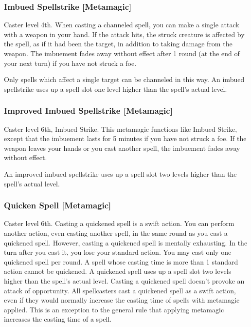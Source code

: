 \subsubsection{Imbued Spellstrike [Metamagic]}
 Caster level 4th.
 When casting a channeled spell, you can make a single attack with a weapon in your hand. If the attack hits, the struck creature is affected by the spell, as if it had been the target, in addition to taking damage from the weapon. The imbuement fades away without effect after 1 round (at the end of your next turn) if you have not struck a foe.

Only spells which affect a single target can be channeled in this way. An imbued spellstrike uses up a spell slot one level higher than the spell's actual level.

\subsubsection{Improved Imbued Spellstrike [Metamagic]}
 Caster level 6th, Imbued Strike.
 This metamagic functions like Imbued Strike, except that the imbuement lasts for 5 minutes if you have not struck a foe. If the weapon leaves your hands or you cast another spell, the imbuement fades away without effect.

An improved imbued spellstrike uses up a spell slot two levels higher than the spell's actual level.

\subsubsection{Quicken Spell [Metamagic]}
 Caster level 6th.
 Casting a quickened spell is a swift action. You can perform another action, even casting another spell, in the same round as you cast a quickened spell. However, casting a quickened spell is mentally exhausting. In the turn after you cast it, you lose your standard action. You may cast only one quickened spell per round. A spell whose casting time is more than 1 standard action cannot be quickened. A quickened spell uses up a spell slot two levels higher than the spell's actual level. Casting a quickened spell doesn't provoke an attack of opportunity.
 All spellcasters cast a quickened spell as a swift action, even if they would normally increase the casting time of spells with metamagic applied. This is an exception to the general rule that applying metamagic increases the casting time of a spell.

